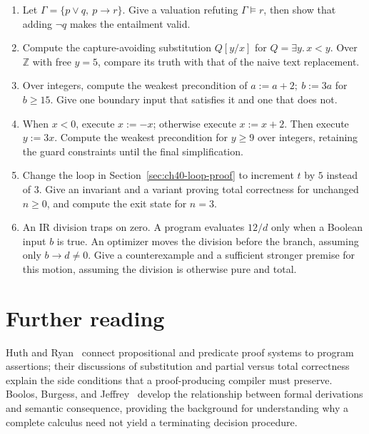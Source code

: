 \begin{enumerate}
\item\label{ex:ch40-entailment}
Let $\Gamma=\{p\lor q,\ p\rightarrow r\}$.
Give a valuation refuting $\Gamma\models r$, then show that adding $\neg q$ makes the entailment valid.

\item\label{ex:ch40-capture}
Compute the capture-avoiding substitution $Q[y/x]$ for $Q=\exists y.\,x<y$.
Over $\mathbb Z$ with free $y=5$, compare its truth with that of the naive text replacement.

\item\label{ex:ch40-sequence}
Over integers, compute the weakest precondition of $a:=a+2;\ b:=3a$ for $b\geq15$.
Give one boundary input that satisfies it and one that does not.

\item\label{ex:ch40-branch}
When $x<0$, execute $x:=-x$; otherwise execute $x:=x+2$.
Then execute $y:=3x$.
Compute the weakest precondition for $y\geq9$ over integers, retaining the guard constraints until the final simplification.

\item\label{ex:ch40-invariant}
Change the loop in Section~\ref{sec:ch40-loop-proof} to increment $t$ by $5$ instead of $3$.
Give an invariant and a variant proving total correctness for unchanged $n\geq0$, and compute the exit state for $n=3$.

\item\label{ex:ch40-speculation}
An IR division traps on zero.
A program evaluates $12/d$ only when a Boolean input $b$ is true.
An optimizer moves the division before the branch, assuming only $b\rightarrow d\neq0$.
Give a counterexample and a sufficient stronger premise for this motion, assuming the division is otherwise pure and total.
\end{enumerate}

\section{Further reading}
\label{sec:ch40-reading}

Huth and Ryan~\cite{huth-2004-logic} connect propositional and predicate proof systems to program assertions; their discussions of substitution and partial versus total correctness explain the side conditions that a proof-producing compiler must preserve.
Boolos, Burgess, and Jeffrey~\cite{boolos-2007-computability} develop the relationship between formal derivations and semantic consequence, providing the background for understanding why a complete calculus need not yield a terminating decision procedure.
